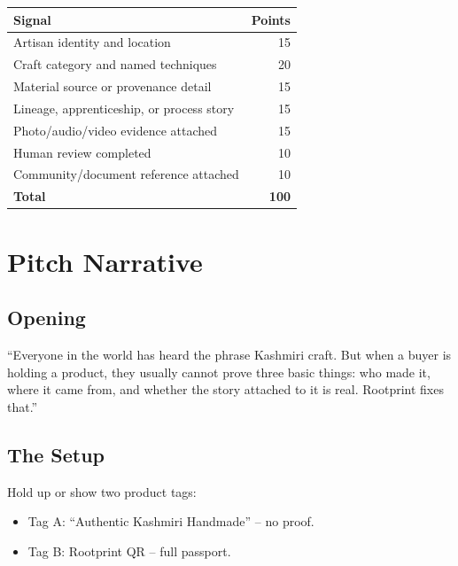 \documentclass[11pt,a4paper]{article}
\begin{document}
\begin{center}
\begin{tabularx}{\linewidth}{Xr}
\toprule
Signal & Points \\
\midrule
Artisan identity and location & 15 \\
Craft category and named techniques & 20 \\
Material source or provenance detail & 15 \\
Lineage, apprenticeship, or process story & 15 \\
Photo/audio/video evidence attached & 15 \\
Human review completed & 10 \\
Community/document reference attached & 10 \\
\midrule
\textbf{Total} & \textbf{100} \\
\bottomrule
\end{tabularx}
\end{center}

\section{Pitch Narrative}

\subsection{Opening}

\begin{blackbox}
``Everyone in the world has heard the phrase Kashmiri craft. But when a buyer is holding a product, they usually cannot prove three basic things: who made it, where it came from, and whether the story attached to it is real. Rootprint fixes that.''
\end{blackbox}

\subsection{The Setup}

Hold up or show two product tags:

\begin{itemize}
  \item Tag A: ``Authentic Kashmiri Handmade'' -- no proof.
  \item Tag B: Rootprint QR -- full passport.
\end{itemize}
\end{document}
